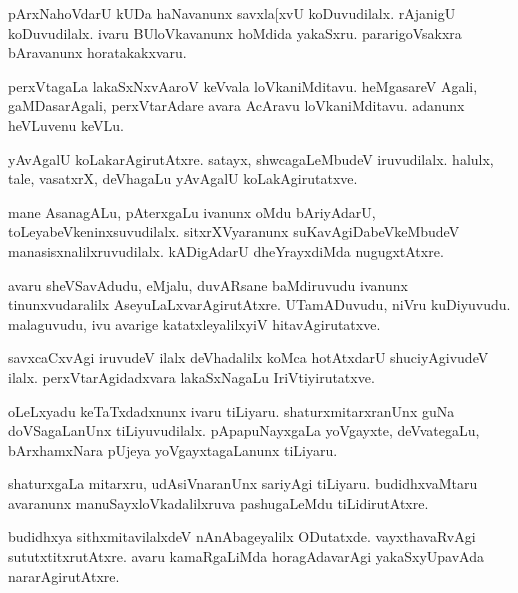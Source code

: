 \documentclass{article}
\begin{document}
\begin{mng}%
pArxNahoVdarU kUDa haNavanunx savxla[xvU koDuvudilalx. rAjanigU koDuvudilalx. ivaru BUloVkavanunx 
hoMdida yakaSxru. pararigoVsakxra bAravanunx horatakakxvaru.
\end{mng}

\begin{mng}%
perxVtagaLa lakaSxNxvAaroV keVvala loVkaniMditavu. heMgasareV Agali, gaMDasarAgali, perxVtarAdare 
avara AcAravu loVkaniMditavu. adanunx heVLuvenu keVLu.
\end{mng}

\begin{mng}%
yAvAgalU koLakarAgirutAtxre. satayx, shwcagaLeMbudeV iruvudilalx. halulx, tale, vasatxrX, deVhagaLu 
yAvAgalU koLakAgirutatxve.
\end{mng}

\begin{mng}%
mane AsanagALu, pAterxgaLu ivanunx oMdu bAriyAdarU, toLeyabeVkeninxsuvudilalx. sitxrXVyaranunx 
suKavAgiDabeVkeMbudeV manasisxnalilxruvudilalx. kADigAdarU dheYrayxdiMda nugugxtAtxre.
\end{mng}

\begin{mng}%
avaru sheVSavAdudu, eMjalu, duvARsane baMdiruvudu ivanunx tinunxvudaralilx AseyuLaLxvarAgirutAtxre. 
UTamADuvudu, niVru kuDiyuvudu. malaguvudu, ivu avarige katatxleyalilxyiV hitavAgirutatxve.
\end{mng}

\begin{mng}%
savxcaCxvAgi iruvudeV ilalx deVhadalilx koMca hotAtxdarU shuciyAgivudeV ilalx. perxVtarAgidadxvara 
lakaSxNagaLu IriVtiyirutatxve.
\end{mng}

\begin{mng}%
oLeLxyadu keTaTxdadxnunx ivaru tiLiyaru. shaturxmitarxranUnx guNa doVSagaLanUnx tiLiyuvudilalx. 
pApapuNayxgaLa yoVgayxte, deVvategaLu, bArxhamxNara pUjeya yoVgayxtagaLanunx tiLiyaru.
\end{mng}

\begin{mng}%
shaturxgaLa mitarxru, udAsiVnaranUnx sariyAgi tiLiyaru. budidhxvaMtaru avaranunx 
manuSayxloVkadalilxruva pashugaLeMdu tiLidirutAtxre.
\end{mng}

\begin{mng}%
budidhxya sithxmitavilalxdeV nAnAbageyalilx ODutatxde. vayxthavaRvAgi sututxtitxrutAtxre. avaru 
kamaRgaLiMda horagAdavarAgi yakaSxyUpavAda nararAgirutAtxre.
\end{mng}
\end{document}
